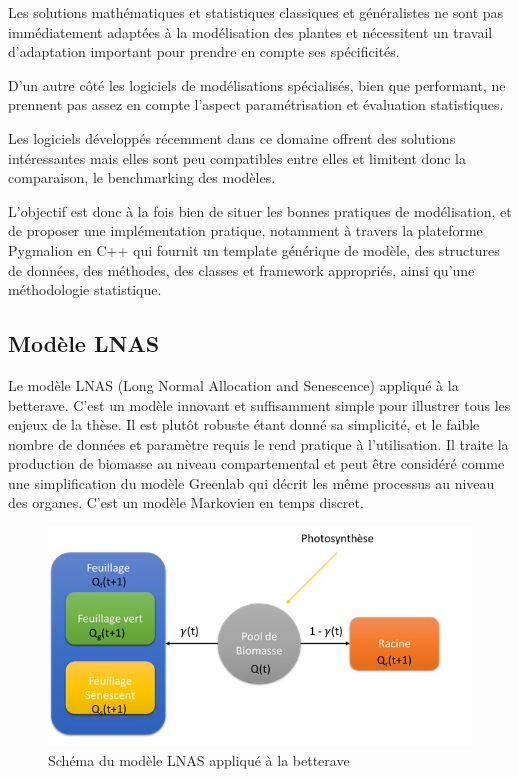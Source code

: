 Les solutions mathématiques et statistiques classiques et généralistes ne sont pas immédiatement adaptées à la modélisation des plantes et nécessitent un travail d’adaptation important pour prendre en compte ses spécificités.

D’un autre côté les logiciels de modélisations spécialisés, bien que performant, ne prennent pas assez en compte l’aspect paramétrisation et évaluation statistiques.

Les logiciels développés récemment dans ce domaine offrent des solutions intéressantes mais elles sont peu compatibles entre elles et limitent donc la comparaison, le benchmarking des modèles.

L’objectif est donc à la fois bien de situer les bonnes pratiques de modélisation, et de proposer une implémentation pratique, notamment à travers la plateforme Pygmalion en C++ qui fournit un template générique de modèle, des structures de données, des méthodes, des classes et framework appropriés, ainsi qu’une méthodologie statistique.

\subsection{Modèle LNAS}

Le modèle LNAS (Long Normal Allocation and Senescence) appliqué à la betterave. C’est un modèle innovant et suffisamment simple pour illustrer tous les enjeux de la thèse. Il est plutôt robuste étant donné sa simplicité, et le faible nombre de données et paramètre requis le rend pratique à l’utilisation. Il traite la production de biomasse au niveau compartemental et peut être considéré comme une simplification du modèle Greenlab qui décrit les même processus au niveau des organes.
C’est un modèle Markovien en temps discret.

\begin{figure}[h]
	\begin{center}
	
	
  \includegraphics[scale=1.0]{./img/sBeetRoot.jpg}
  \caption{Schéma du modèle LNAS appliqué à la betterave}
  \label{fig:sBeetRoot}
  
  \end{center}
\end{figure}

